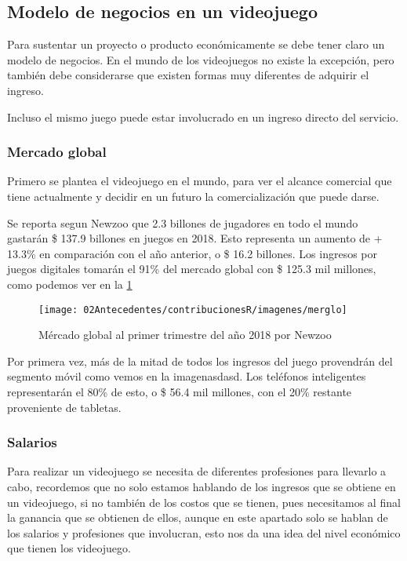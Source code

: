 \subsection{Modelo de negocios en un videojuego}\label{modeloNegocio}
Para sustentar un proyecto o producto económicamente se debe tener claro un modelo de negocios. En el mundo de los videojuegos no existe la excepción, pero también debe considerarse que existen formas muy diferentes de adquirir el ingreso.

Incluso el mismo juego puede estar involucrado en un ingreso directo del servicio.

\subsubsection{Mercado global}
Primero se plantea el videojuego en el mundo, para ver el alcance comercial que tiene actualmente y decidir en un futuro la comercialización que puede darse.

Se reporta segun Newzoo \cite{newzoo2018} que 2.3 billones de jugadores en todo el mundo gastarán \$ 137.9 billones en juegos en 2018. Esto representa un aumento de + 13.3\% en comparación con el año anterior, o \$ 16.2 billones. Los ingresos por juegos digitales tomarán el 91\% del mercado global con \$ 125.3 mil millones, como podemos ver en la \ref{fig:merglo}
\begin{figure}
	\centering
	\caption{Mércado global al primer trimestre del año 2018 por Newzoo \cite{newzoo2018}}
	\label{fig:merglo}
	\texttt{[image: 02Antecedentes/contribucionesR/imagenes/merglo]}
\end{figure}

Por primera vez, más de la mitad de todos los ingresos del juego provendrán del segmento móvil como vemos en la imagen{asdasd}. Los teléfonos inteligentes representarán el 80\% de esto, o \$ 56.4 mil millones, con el 20\% restante proveniente de tabletas.

\subsubsection{Salarios}
Para realizar un videojuego se necesita de diferentes profesiones para llevarlo a cabo, recordemos que no solo estamos hablando de los ingresos que se obtiene en un videojuego, si no también de los costos que se tienen, pues necesitamos al final la ganancia que se obtienen de ellos, aunque en este apartado solo se hablan de los salarios y profesiones que involucran, esto nos da una idea del nivel económico que tienen los videojuego.

